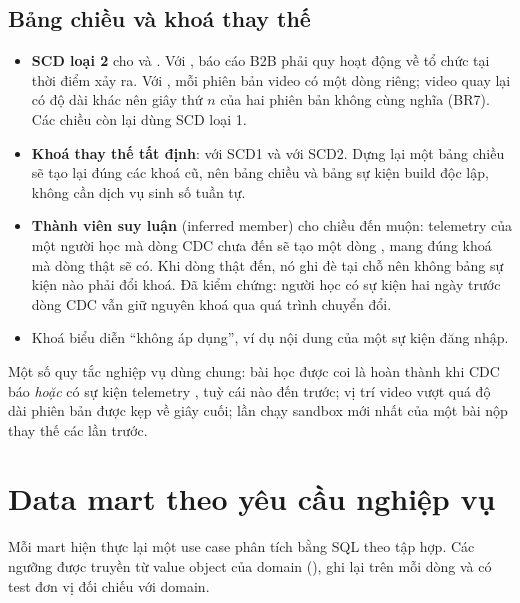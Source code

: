 \subsection{Bảng chiều và khoá thay thế}

\begin{itemize}
  \item \textbf{SCD loại 2} cho  và . Với , báo cáo B2B phải quy hoạt động về tổ chức tại thời điểm xảy ra. Với , mỗi phiên bản video có một dòng riêng; video quay lại có độ dài khác nên giây thứ $n$ của hai phiên bản không cùng nghĩa (BR7). Các chiều còn lại dùng SCD loại 1.
  \item \textbf{Khoá thay thế tất định}:  với SCD1 và  với SCD2. Dựng lại một bảng chiều sẽ tạo lại đúng các khoá cũ, nên bảng chiều và bảng sự kiện build độc lập, không cần dịch vụ sinh số tuần tự.
  \item \textbf{Thành viên suy luận} (inferred member) cho chiều đến muộn: telemetry của một người học mà dòng CDC chưa đến sẽ tạo một dòng , mang đúng khoá mà dòng thật sẽ có. Khi dòng thật đến, nó ghi đè tại chỗ nên không bảng sự kiện nào phải đổi khoá. Đã kiểm chứng: người học  có sự kiện hai ngày trước dòng CDC vẫn giữ nguyên khoá qua quá trình chuyển đổi.
  \item Khoá  biểu diễn ``không áp dụng'', ví dụ nội dung của một sự kiện đăng nhập.
\end{itemize}

Một số quy tắc nghiệp vụ dùng chung: bài học được coi là hoàn thành khi CDC báo  \emph{hoặc} có sự kiện telemetry , tuỳ cái nào đến trước; vị trí video vượt quá độ dài phiên bản được kẹp về giây cuối; lần chạy sandbox mới nhất của một bài nộp thay thế các lần trước.

\section{Data mart theo yêu cầu nghiệp vụ}

Mỗi mart hiện thực lại một use case phân tích bằng SQL theo tập hợp. Các ngưỡng được truyền từ value object của domain (), ghi lại trên mỗi dòng và có test đơn vị đối chiếu với domain.

